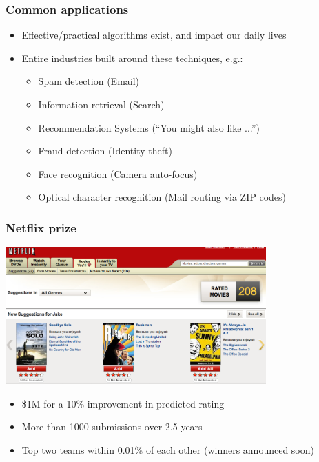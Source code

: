 \documentclass[xcolor=dvipsnames, 9pt]{beamer}
\begin{document}
\begin{frame}
  \frametitle{Common applications}

  \begin{itemize}
    \item Effective/practical algorithms exist, and impact our daily lives
    \item Entire industries built around these techniques, e.g.:
      \begin{itemize}
        \item Spam detection (Email)
        \item Information retrieval (Search)
        \item Recommendation Systems (``You might also like ...'')
        \item Fraud detection (Identity theft)
        \item Face recognition (Camera auto-focus)
        \item Optical character recognition (Mail routing via ZIP codes)
      \end{itemize}
  \end{itemize}

\end{frame}


\begin{frame}
  \frametitle{Netflix prize}

    \begin{center}
      \includegraphics[width=0.75\textwidth]{netflix.png}
    \end{center}

    \begin{itemize}
      \item \$1M for a 10\% improvement in predicted rating
      \item More than 1000 submissions over 2.5 years
      \item Top two teams within 0.01\% of each other (winners announced soon)
    \end{itemize}

\end{frame}
\end{document}
